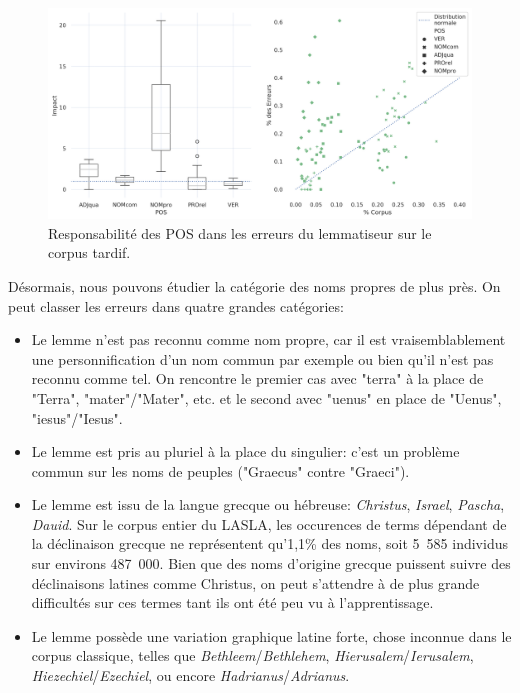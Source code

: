 \begin{figure}
    \centering
    \includegraphics[width=1\linewidth]{results/lemmatisation/extensibilite/LatinTardifPosErrorBoxPlot.png}
    \caption{Responsabilité des POS dans les erreurs du lemmatiseur sur le corpus tardif.}
    \label{fig:latin_tardif_error_pos}
\end{figure}

Désormais, nous pouvons étudier la catégorie des noms propres de plus près. On peut classer les erreurs dans quatre grandes catégories:
\begin{itemize}
    \item Le lemme n'est pas reconnu comme nom propre, car il est vraisemblablement une personnification d'un nom commun par exemple ou bien qu'il n'est pas reconnu comme tel. On rencontre le premier cas avec "terra" à la place de "Terra", "mater"/"Mater", etc. et le second avec "uenus" en place de "Uenus", "iesus"/"Iesus".
    \item Le lemme est pris au pluriel à la place du singulier: c'est un problème commun sur les noms de peuples ("Graecus" contre "Graeci").
    \item Le lemme est issu de la langue grecque ou hébreuse: \textit{Christus}, \textit{Israel}, \textit{Pascha}, \textit{Dauid}. Sur le corpus entier du LASLA, les occurences de terms dépendant de la déclinaison grecque ne représentent qu'1,1\% des noms, soit 5~585 individus sur environs 487~000. Bien que des noms d'origine grecque puissent suivre des déclinaisons latines comme Christus, on peut s'attendre à de plus grande difficultés sur ces termes tant ils ont été peu vu à l'apprentissage.
    \item Le lemme possède une variation graphique latine forte, chose inconnue dans le corpus classique, telles que \textit{Bethleem}/\textit{Bethlehem}, \textit{Hierusalem}/\textit{Ierusalem}, \textit{Hiezechiel}/\textit{Ezechiel}, ou encore \textit{Hadrianus}/\textit{Adrianus}.
\end{itemize}

